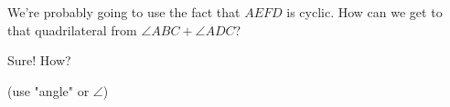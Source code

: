 

We're probably going to use the fact that $AEFD$ is cyclic. How can we get to that quadrilateral from $\angle ABC + \angle ADC$?


Sure! How?

(use "angle" or $\angle$)
















